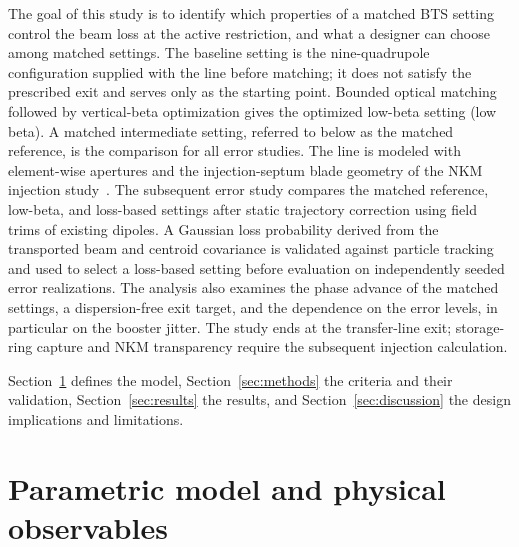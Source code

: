 \documentclass[final,5p,twocolumn]{elsarticle}
\begin{document}
The goal of this study is to identify which properties of a matched BTS setting
control the beam loss at the active restriction, and what a designer can choose
among matched settings. The baseline setting is the nine-quadrupole configuration
supplied with the line before matching; it does not satisfy the prescribed exit and
serves only as the starting point. Bounded optical matching followed by
vertical-beta optimization gives the optimized low-beta setting (low beta). A
matched intermediate setting, referred to below as the matched reference, is the
comparison for all error studies. The line is modeled with element-wise apertures
and the injection-septum blade geometry of the NKM injection
study~\cite{ParkNKM2026}. The subsequent error study compares the matched reference,
low-beta, and loss-based settings after
static trajectory correction using field trims of existing dipoles. A Gaussian
loss probability derived from the transported beam and centroid covariance is
validated against particle tracking and used to select a loss-based setting
before evaluation on independently seeded error realizations. The analysis also
examines the phase advance of the matched settings, a dispersion-free exit target,
and the dependence on the error levels, in particular on the booster jitter. The study ends at the transfer-line exit; storage-ring
capture and NKM transparency require the subsequent injection calculation.

Section~\ref{sec:model} defines the model, Section~\ref{sec:methods} the criteria and
their validation, Section~\ref{sec:results} the results, and
Section~\ref{sec:discussion} the design implications and limitations.

\section{Parametric model and physical observables}\label{sec:model}
\end{document}

